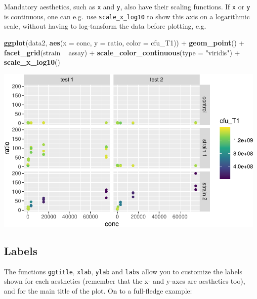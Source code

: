 \documentclass[]{book}
\newenvironment{Shaded}{}{}
\newcommand{\DataTypeTok}[1]{\textcolor[rgb]{0.56,0.13,0.00}{#1}}
\newcommand{\KeywordTok}[1]{\textcolor[rgb]{0.00,0.44,0.13}{\textbf{#1}}}
\newcommand{\NormalTok}[1]{#1}
\newcommand{\OperatorTok}[1]{\textcolor[rgb]{0.40,0.40,0.40}{#1}}
\newcommand{\StringTok}[1]{\textcolor[rgb]{0.25,0.44,0.63}{#1}}
\begin{document}
Mandatory aesthetics, such as \texttt{x} and \texttt{y}, also have their scaling functions. If \texttt{x} or \texttt{y} is continuous, one can e.g.~use \texttt{scale\_x\_log10} to show this axis on a logarithmic scale, without having to log-tansform the data before plotting, e.g.

\begin{Shaded}
\begin{Highlighting}[]
\KeywordTok{ggplot}\NormalTok{(data2, }\KeywordTok{aes}\NormalTok{(}\DataTypeTok{x =}\NormalTok{ conc, }\DataTypeTok{y =}\NormalTok{ ratio, }\DataTypeTok{color =}\NormalTok{ cfu_T1)) }\OperatorTok{+}
\StringTok{  }\KeywordTok{geom_point}\NormalTok{() }\OperatorTok{+}
\StringTok{  }\KeywordTok{facet_grid}\NormalTok{(strain }\OperatorTok{~}\StringTok{ }\NormalTok{assay) }\OperatorTok{+}
\StringTok{  }\KeywordTok{scale_color_continuous}\NormalTok{(}\DataTypeTok{type =} \StringTok{"viridis"}\NormalTok{) }\OperatorTok{+}
\StringTok{  }\KeywordTok{scale_x_log10}\NormalTok{()}
\end{Highlighting}
\end{Shaded}

\begin{center}\includegraphics[width=\textwidth]{TRES-Tidy-Tutorial_files/figure-latex/unnamed-chunk-141-1} \end{center}

\hypertarget{labels}{%
\subsection{Labels}\label{labels}}

The functions \texttt{ggtitle}, \texttt{xlab}, \texttt{ylab} and \texttt{labs} allow you to customize the labels shown for each aesthetics (remember that the x- and y-axes are aesthetics too), and for the main title of the plot. On to a full-fledge example:
\end{document}
